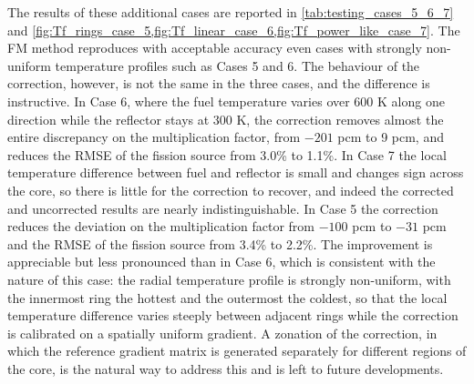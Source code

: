 \documentclass[preprint,review,12pt]{elsarticle}
\newif\ifhighlight
\newcommand{\rtwo}[1]{\ifhighlight\textcolor{revtwo}{#1}\else#1\fi}
\begin{document}
The results of these additional cases are reported in \cref{tab:testing_cases_5_6_7} and \cref{fig:Tf_rings_case_5,fig:Tf_linear_case_6,fig:Tf_power_like_case_7}. 
\rtwo{The FM method reproduces with acceptable accuracy even cases with strongly non-uniform temperature profiles such as Cases 5 and 6. The behaviour of the correction, however, is not the same in the three cases, and the difference is instructive. In Case 6, where the fuel temperature varies over 600 K along one direction while the reflector stays at 300 K, the correction removes almost the entire discrepancy on the multiplication factor, from $-201$ pcm to 9 pcm, and reduces the RMSE of the fission source from 3.0\% to 1.1\%. In Case 7 the local temperature difference between fuel and reflector is small and changes sign across the core, so there is little for the correction to recover, and indeed the corrected and uncorrected results are nearly indistinguishable. In Case 5 the correction reduces the deviation on the multiplication factor from $-100$ pcm to $-31$ pcm and the RMSE of the fission source from 3.4\% to 2.2\%. The improvement is appreciable but less pronounced than in Case 6, which is consistent with the nature of this case: the radial temperature profile is strongly non-uniform, with the innermost ring the hottest and the outermost the coldest, so that the local temperature difference varies steeply between adjacent rings while the correction is calibrated on a spatially uniform gradient. A zonation of the correction, in which the reference gradient matrix is generated separately for different regions of the core, is the natural way to address this and is left to future developments.}    
\end{document}
